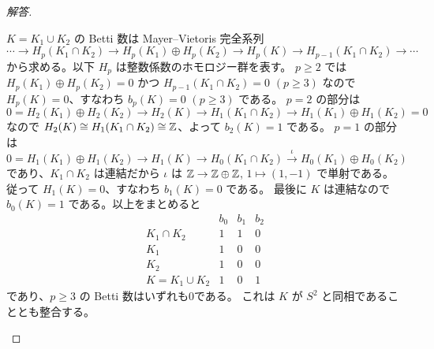 \begin{proof}[解答]
\begin{enumerate}
$K=K_1\cup K_2$ の Betti 数は Mayer--Vietoris 完全系列
\[
\cdots\to H_p(K_1\cap K_2)\to H_p(K_1)\oplus H_p(K_2)
\to H_p(K)\to H_{p-1}(K_1\cap K_2)\to\cdots
\]
から求める。以下 $H_p$ は整数係数のホモロジー群を表す。
$p\ge2$ では $H_p(K_1)\oplus H_p(K_2)=0$ かつ $H_{p-1}(K_1\cap K_2)=0$ $(p\ge3)$ なので
$H_p(K)=0$、すなわち $b_p(K)=0$ $(p\ge3)$ である。
$p=2$ の部分は
\[
0=H_2(K_1)\oplus H_2(K_2)\to H_2(K)\to H_1(K_1\cap K_2)\to H_1(K_1)\oplus H_1(K_2)=0
\]
なので $H_2(K)\cong H_1(K_1\cap K_2)\cong\mathbb{Z}$、よって $b_2(K)=1$ である。
$p=1$ の部分は
\[
0=H_1(K_1)\oplus H_1(K_2)\to H_1(K)\to
H_0(K_1\cap K_2)\xrightarrow{\ \iota\ }H_0(K_1)\oplus H_0(K_2)
\]
であり、$K_1\cap K_2$ は連結だから $\iota$ は $\mathbb{Z}\to\mathbb{Z}\oplus\mathbb{Z}$, $1\mapsto(1,-1)$ で単射である。
従って $H_1(K)=0$、すなわち $b_1(K)=0$ である。
最後に $K$ は連結なので $b_0(K)=1$ である。以上をまとめると
\[
\begin{array}{c|ccc}
&b_0&b_1&b_2\\\hline
K_1\cap K_2&1&1&0\\
K_1&1&0&0\\
K_2&1&0&0\\
K=K_1\cup K_2&1&0&1
\end{array}
\]
であり、$p\ge3$ の Betti 数はいずれも0である。
これは $K$ が $S^2$ と同相であることとも整合する。
\end{enumerate}
\end{proof}


